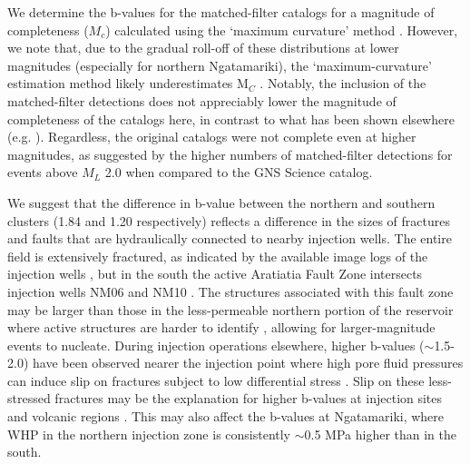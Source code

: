 We determine the b-values for the matched-filter catalogs for a magnitude of completeness ($M_c$) calculated using the `maximum curvature' method \citep{Wiemer_1997}. However, we note that, due to the gradual roll-off of these distributions at lower magnitudes (especially for northern Ngatamariki), the `maximum-curvature' estimation method likely underestimates M$_C$ \citep{Wiemer_2000}. Notably, the inclusion of the matched-filter detections does not appreciably lower the magnitude of completeness of the catalogs here, in contrast to what has been shown elsewhere (e.g. \citet{Shelly_2016}). Regardless, the original catalogs were not complete even at higher magnitudes, as suggested by the higher numbers of matched-filter detections for events above $M_L$ 2.0 when compared to the GNS Science catalog.

We suggest that the difference in b-value between the northern and southern clusters (1.84 and 1.20 respectively) reflects a difference in the sizes of fractures and faults that are hydraulically connected to nearby injection wells. The entire field is extensively fractured, as indicated by the available image logs of the injection wells \citep{nm09_report,nm10_report,massiot_2012}, but in the south the active Aratiatia Fault Zone intersects injection wells NM06 and NM10 \citep{nm10_report}. The structures associated with this fault zone may be larger than those in the less-permeable northern portion of the reservoir where active structures are harder to identify \citep{massiot_2012}, allowing for larger-magnitude events to nucleate. During injection operations elsewhere, higher b-values ($\sim$1.5-2.0) have been observed nearer the injection point where high pore fluid pressures can induce slip on fractures subject to low differential stress \citep[e.g.][]{Bachmann_2012}. Slip on these less-stressed fractures may be the explanation for higher b-values at injection sites and volcanic regions \citep{Wiemer_1998}. This may also affect the b-values at Ngatamariki, where WHP in the northern injection zone is consistently $\sim$0.5 MPa higher than in the south.

